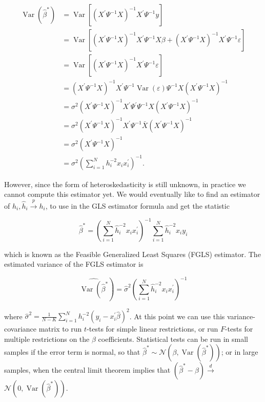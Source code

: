 $$
\begin{aligned}
\operatorname{Var}\left(\widehat{\beta}^{*}\right) & =\operatorname{Var}\left[\left(X^{\prime} \Psi^{-1} X\right)^{-1} X^{\prime} \Psi^{-1} y\right] \\
& =\operatorname{Var}\left[\left(X^{\prime} \Psi^{-1} X\right)^{-1} X^{\prime} \Psi^{-1} X \beta+\left(X^{\prime} \Psi^{-1} X\right)^{-1} X^{\prime} \Psi^{-1} \varepsilon\right] \\
& =\operatorname{Var}\left[\left(X^{\prime} \Psi^{-1} X\right)^{-1} X^{\prime} \Psi^{-1} \varepsilon\right] \\
& =\left(X^{\prime} \Psi^{-1} X\right)^{-1} X^{\prime} \Psi^{-1} \operatorname{Var}(\varepsilon) \Psi^{-1} X\left(X^{\prime} \Psi^{-1} X\right)^{-1} \\
& =\sigma^{2}\left(X^{\prime} \Psi^{-1} X\right)^{-1} X^{\prime} \Psi^{\prime} \Psi^{-1} X\left(X^{\prime} \Psi^{-1} X\right)^{-1} \\
& =\sigma^{2}\left(X^{\prime} \Psi^{-1} X\right)^{-1} X^{\prime} \Psi^{-1} \bar{X}\left(X^{\prime} \Psi^{-1} X\right)^{-1} \\
& =\sigma^{2}\left(X^{\prime} \Psi^{-1} X\right)^{-1} \\
& =\sigma^{2}\left(\sum_{i=1}^{N} h_{i}^{-2} x_{i} x_{i}^{\prime}\right)^{-1} .
\end{aligned}
$$

However, since the form of heteroskedasticity is still unknown, in practice we cannot compute this estimator yet. We would eventually like to find an estimator of $h_{i}, \widehat{h}_{i} \xrightarrow{p} h_{i}$, to use in the GLS estimator formula and get the statistic

$$
\widehat{\beta}^{*}=\left(\sum_{i=1}^{N} \widehat{h}_{i}^{-2} x_{i} x_{i}^{\prime}\right)^{-1} \sum_{i=1}^{N} \widehat{h}_{i}^{-2} x_{i} y_{i}
$$

which is known as the Feasible Generalized Least Squares (FGLS) estimator. The estimated variance of the FGLS estimator is

$$
\left.\widehat{\operatorname{Var}\left(\widehat{\beta}^{*}\right.}\right)=\widehat{\sigma}^{2}\left(\sum_{i=1}^{N} \widehat{h}_{i}^{-2} x_{i} x_{i}^{\prime}\right)^{-1}
$$

where $\widehat{\sigma}^{2}=\frac{1}{N-K} \sum_{i=1}^{N} h_{i}^{-2}\left(y_{i}-x_{i}^{\prime} \widehat{\beta}\right)^{2}$. At this point we can use this variance-covariance matrix to run $t$-tests for simple linear restrictions, or run $F$-tests for multiple restrictions on the $\beta$ coefficients. Statistical tests can be run in small samples if the error term is normal, so that $\widehat{\beta}^{*} \sim \mathcal{N}\left(\beta, \operatorname{Var}\left(\widehat{\beta}^{*}\right)\right)$; or in large samples, when the central limit theorem implies that $\left(\widehat{\beta}^{*}-\beta\right) \xrightarrow{d}$ $\mathcal{N}\left(0, \operatorname{Var}\left(\widehat{\beta}^{*}\right)\right)$.

